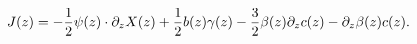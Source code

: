 \begin{equation}
J(z) = - { 1\over 2} \psi(z)\cdot \partial_zX(z) +{1\over2}b(z)
\gamma(z) -{3\over 2}\beta(z)\partial_zc(z) -
\partial_z\beta(z)c(z).
\end{equation}

